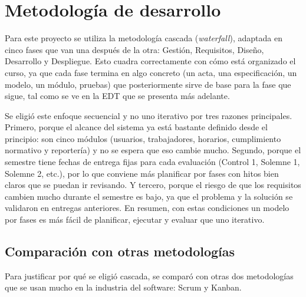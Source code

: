 \documentclass[12pt,letterpaper]{article}
\begin{document}
\section{Metodología de desarrollo}

Para este proyecto se utiliza la metodología cascada (\textit{waterfall}), adaptada en cinco fases que van una después de la otra: Gestión, Requisitos, Diseño, Desarrollo y Despliegue. Esto cuadra correctamente con cómo está organizado el curso, ya que cada fase termina en algo concreto (un acta, una especificación, un modelo, un módulo, pruebas) que posteriormente sirve de base para la fase que sigue, tal como se ve en la EDT que se presenta más adelante.

Se eligió este enfoque secuencial y no uno iterativo por tres razones principales. Primero, porque el alcance del sistema ya está bastante definido desde el principio: son cinco módulos (usuarios, trabajadores, horarios, cumplimiento normativo y reportería) y no se espera que eso cambie mucho. Segundo, porque el semestre tiene fechas de entrega fijas para cada evaluación (Control 1, Solemne 1, Solemne 2, etc.), por lo que conviene más planificar por fases con hitos bien claros que se puedan ir revisando. Y tercero, porque el riesgo de que los requisitos cambien mucho durante el semestre es bajo, ya que el problema y la solución se validaron en entregas anteriores. En resumen, con estas condiciones un modelo por fases es más fácil de planificar, ejecutar y evaluar que uno iterativo.

\subsection{Comparación con otras metodologías}

Para justificar por qué se eligió cascada, se comparó con otras dos metodologías que se usan mucho en la industria del software: Scrum y Kanban.
\end{document}
